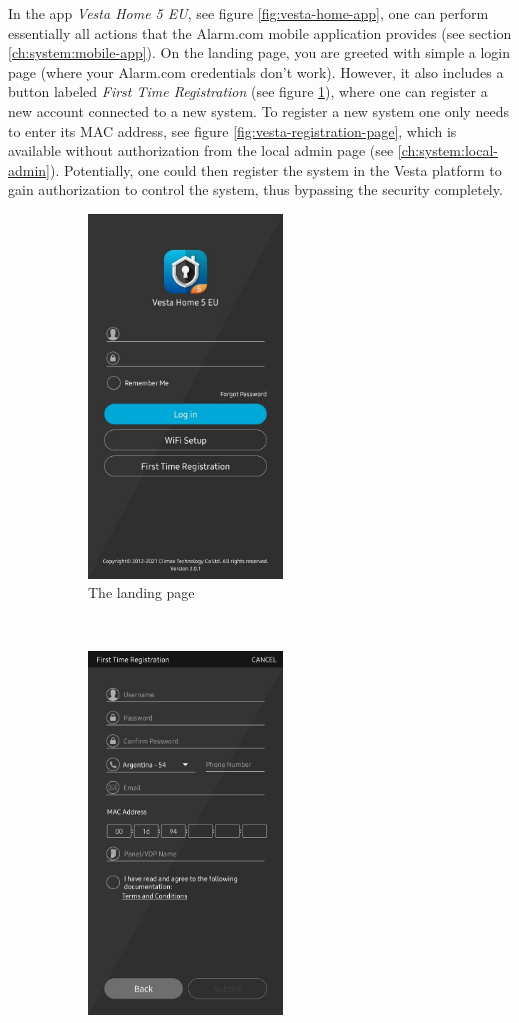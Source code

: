 In the app \textit{Vesta Home 5 EU}, see figure \ref{fig:vesta-home-app}, one can perform essentially all actions that the Alarm.com mobile application provides (see section \ref{ch:system:mobile-app}). On the landing page, you are greeted with simple a login page (where your Alarm.com credentials don't work). However, it also includes a button labeled \textit{First Time Registration} (see figure \ref{fig:vesta-landing-page}), where one can register a new account connected to a new system. To register a new system one only needs to enter its MAC address, see figure \ref{fig:vesta-registration-page}, which is available without authorization from the local admin page (see \ref{ch:system:local-admin}). Potentially, one could then register the system in the Vesta platform to gain authorization to control the system, thus bypassing the security completely.
\begin{figure}[!ht]
    \centering
    \begin{subfigure}[t]{0.4\textwidth}
        \includegraphics[height=3.8in]{images/6-pentesting/vesta-home-landing-page.jpg}
        \caption{The landing page}
        \label{fig:vesta-landing-page}
    \end{subfigure}%
    ~
    \begin{subfigure}[t]{0.4\textwidth}
        \includegraphics[height=3.8in]{images/6-pentesting/vesta-home-registration.jpg}

\end{subfigure}
\end{figure}
